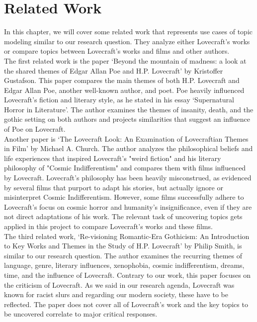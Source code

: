 \section{Related Work}

In this chapter, we will cover some related work that represents use cases of topic modeling 
similar to our research question. They analyze either Lovecraft’s works or compare topics 
between Lovecraft’s works and films and other authors.\\

The first related work is the paper ‘Beyond the mountain of madness: a look at the shared 
themes of Edgar Allan Poe and H.P. Lovecraft’ by Kristoffer Gustafson. This paper compares 
the main themes of both H.P. Lovecraft and Edgar Allan Poe, another well-known author, and 
poet. Poe heavily influenced Lovecraft’s fiction and literary style, as he stated in his essay 
‘Supernatural Horror in Literature’. The author examines the themes of insanity, death, and the 
gothic setting on both authors and projects similarities that suggest an influence of Poe on 
Lovecraft.\\

Another paper is ‘The Lovecraft Look: An Examination of Lovecraftian Themes in Film’ by 
Michael A. Church. The author analyzes the philosophical beliefs and life experiences that 
inspired Lovecraft's "weird fiction" and his literary philosophy of "Cosmic Indifferentism" 
and compares them with films influenced by Lovecraft. Lovecraft's philosophy has been heavily 
misconstrued, as evidenced by several films that purport to adapt his stories, but actually 
ignore or misinterpret Cosmic Indifferentism. However, some films successfully adhere to 
Lovecraft's focus on cosmic horror and humanity's insignificance, even if they are not direct 
adaptations of his work. The relevant task of uncovering topics gets applied in this project 
to compare Lovecraft’s works and these films.\\

The third related work, ‘Re-visioning Romantic-Era Gothicism: An Introduction to Key Works 
and Themes in the Study of H.P. Lovecraft’ by Philip Smith, is similar to our research 
question. The author examines the recurring themes of language, genre, literary influences, 
xenophobia, cosmic indifferentism, dreams, time, and the influence of Lovecraft. Contrary 
to our work, this paper focuses on the criticism of Lovecraft. As we said in our research 
agenda, Lovecraft was known for racist slurs and regarding our modern society, these have 
to be reflected. The paper does not cover all of Lovecraft’s work and the key topics to be 
uncovered correlate to major critical responses.